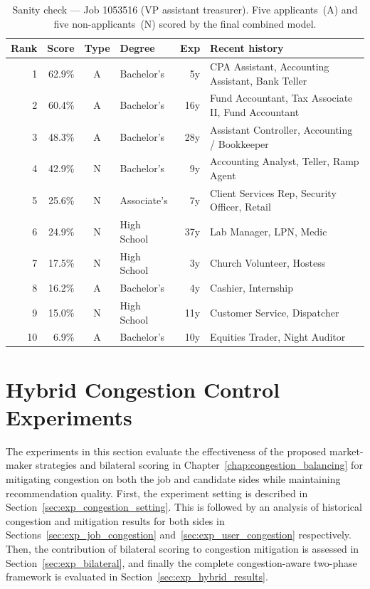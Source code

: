 \begin{table}[H]
    \centering
    \caption{Sanity check --- Job 1053516 (VP assistant treasurer).
    Five applicants~(A) and five non-applicants~(N) scored by the
    final combined model.}
    \label{tab:sanity_vp_treasurer}
    \small
    \begin{tabular}{r r c l r p{5.5cm}}
        \toprule
        \textbf{Rank} & \textbf{Score} & \textbf{Type} &
        \textbf{Degree} & \textbf{Exp} & \textbf{Recent history} \\
        \midrule
        1  & 62.9\% & A & Bachelor's  &  5y & CPA Assistant, Accounting Assistant, Bank Teller \\
        2  & 60.4\% & A & Bachelor's  & 16y & Fund Accountant, Tax Associate II, Fund Accountant \\
        3  & 48.3\% & A & Bachelor's  & 28y & Assistant Controller, Accounting / Bookkeeper \\
        4  & 42.9\% & N & Bachelor's  &  9y & Accounting Analyst, Teller, Ramp Agent \\
        5  & 25.6\% & N & Associate's &  7y & Client Services Rep, Security Officer, Retail \\
        6  & 24.9\% & N & High School & 37y & Lab Manager, LPN, Medic \\
        7  & 17.5\% & N & High School &  3y & Church Volunteer, Hostess \\
        8  & 16.2\% & A & Bachelor's  &  4y & Cashier, Internship \\
        9  & 15.0\% & N & High School & 11y & Customer Service, Dispatcher \\
        10 &  6.9\% & A & Bachelor's  & 10y & Equities Trader, Night Auditor \\
        \bottomrule
    \end{tabular}
\end{table}
 
\section{Hybrid Congestion Control Experiments} 
\label{sec:exp_congestion}

The experiments in this section evaluate the effectiveness of the proposed market-maker strategies and bilateral scoring in Chapter~\ref{chap:congestion_balancing} for mitigating congestion on both the job and candidate sides while maintaining recommendation quality. First, the experiment setting is described in Section~\ref{sec:exp_congestion_setting}. This is followed by an analysis of historical congestion and mitigation results for both sides in Sections~\ref{sec:exp_job_congestion} and~\ref{sec:exp_user_congestion} respectively. Then, the contribution of bilateral scoring to congestion mitigation is assessed in Section~\ref{sec:exp_bilateral}, and finally the complete congestion-aware two-phase framework is evaluated in Section~\ref{sec:exp_hybrid_results}.

